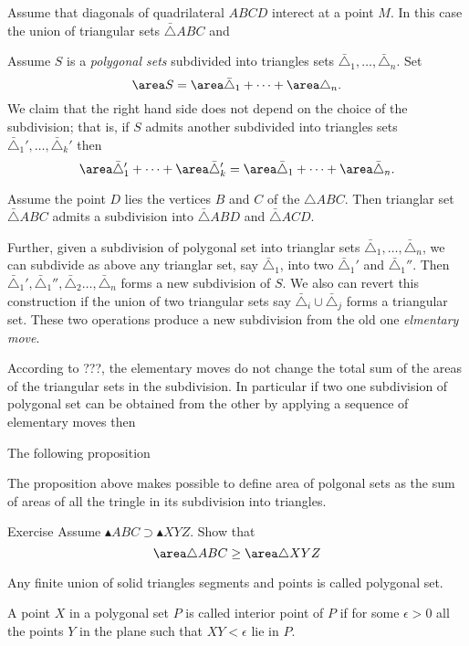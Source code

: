 Assume that diagonals of quadrilateral $ABCD$ interect at a point $M$.
In this case the union of triangular sets $\bar\triangle ABC$ and 

Assume $S$ is a \emph{polygonal sets} subdivided into triangles sets $\bar\triangle_1,\dots,\bar\triangle_n$.
Set 
\[\area S=\area\bar\triangle_1+\dots+\area\triangle_n.\]
We claim that the right hand side does not depend on the choice of the subdivision; 
that is, if $S$ admits another subdivided into triangles sets $\bar\triangle_1',\dots,\bar\triangle_k'$
then 
\[\area\bar\triangle'_1+\dots+\area\bar\triangle'_k
=
\area\bar\triangle_1+\dots+\area\bar\triangle_n.\]


Assume the point $D$ lies the vertices $B$ and $C$ of the $\triangle ABC$.
Then trianglar set $\bar\triangle ABC$ admits a subdivision into  $\bar\triangle ABD$ and $\bar\triangle ACD$.

Further, given a subdivision of polygonal set into trianglar sets $\bar\triangle_1,\dots,\bar\triangle_n$,
we can subdivide as above 
any trianglar set, say $\bar\triangle_1$,
into two $\bar\triangle_1'$ and $\bar\triangle_1''$.
Then 
$\bar\triangle_1',\bar\triangle_1'',\bar\triangle_2\dots,\bar\triangle_n$
forms a new subdivision of $S$.
We also can revert this construction if the union of two triangular sets 
say $\bar\triangle_i\cup \bar\triangle_j$ forms a triangular set.
These two operations produce a new subdivision from the old one \emph{elmentary move}.

According to ???,
the elementary moves do not change the total sum of the areas of the triangular sets in the subdivision.
In particular if two one subdivision of polygonal set can be obtained from the other by applying a sequence of elementary moves then 

The following proposition 



The proposition above makes possible to define area of polgonal sets
as the sum of areas of all the tringle in its subdivision into triangles.


\begin{thm}{Exercise}
Assume $\blacktriangle ABC\supset \blacktriangle XYZ$.
Show that 
\[\area \triangle ABC\ge \area \triangle XYZ\]

\end{thm}


Any finite union of solid triangles segments and points is called polygonal set.

A point $X$ in a polygonal set $P$ is called interior point of $P$ 
if for some $\epsilon>0$ all the points $Y$ in the plane such that $XY<\epsilon$ lie in $P$.

